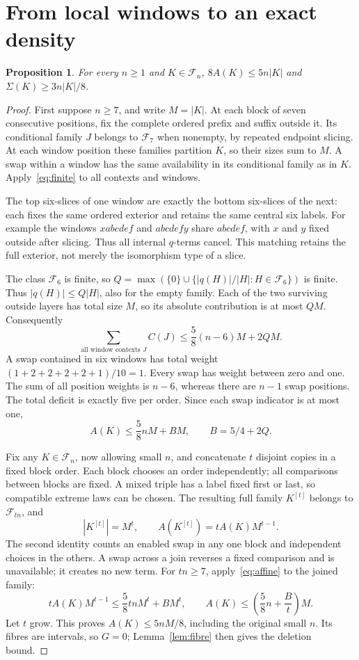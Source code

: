 \documentclass[11pt,letterpaper]{article}
\newtheorem{proposition}[theorem]{Proposition}
\theoremstyle{definition}
\newcommand{\F}{\mathcal F}
\newcommand{\Sig}{\Sigma}
\begin{document}
\clearpage
\section{From local windows to an exact density}\label{sec:windows}
\begin{proposition}\label{prop:density}
For every \(n\geq1\) and \(K\in\F_n\),
\(8A(K)\leq5n|K|\) and \(\Sig(K)\geq3n|K|/8\).
\end{proposition}
\begin{proof}
First suppose \(n\geq7\), and write \(M=|K|\).
At each block of seven consecutive positions, fix the complete ordered
prefix and suffix outside it. Its conditional family \(J\) belongs
to \(\F_7\) when nonempty, by repeated endpoint slicing. At each
window position these families partition \(K\), so their sizes sum
to \(M\). A swap within a window has the same availability in its
conditional family as in \(K\). Apply~\eqref{eq:finite} to all contexts
and windows.

The top six-slices of one window are exactly the bottom six-slices
of the next: each fixes the same ordered exterior and retains the
same central six labels. For example the windows \(xabcdef\) and
\(abcdefy\) share \(abcdef\), with \(x\) and \(y\) fixed outside
after slicing. Thus all internal \(q\)-terms cancel. This matching
retains the full exterior, not merely the isomorphism type of a slice.

The class \(\F_6\) is finite, so
\(Q=\max(\{0\}\cup\{|q(H)|/|H|:H\in\F_6\})\) is finite.
Thus \(|q(H)|\leq Q|H|\), also for the empty family.
Each of the two surviving outside layers has total size
\(M\), so its absolute contribution is at most \(QM\). Consequently
\[
 \sum_{\text{all window contexts }J}C(J)
 \leq\frac58(n-6)M+2QM.
\]
A swap contained in six windows has total weight
\((1+2+2+2+2+1)/10=1\). Every swap has weight between zero and one.
The sum of all position weights is \(n-6\), whereas there are \(n-1\)
swap positions. The total deficit is exactly five per order. Since
each swap indicator is at most one,
\begin{equation}\label{eq:affine}
 A(K)\leq\frac58nM+BM,\qquad B=5/4+2Q.
\end{equation}

Fix any \(K\in\F_n\), now allowing small \(n\), and concatenate
\(t\) disjoint copies in a fixed block order. Each block chooses an
order independently; all comparisons between blocks are fixed.
A mixed triple has a label fixed first or last, so compatible extreme
laws can be chosen. The resulting full family \(K^{[t]}\) belongs
to \(\F_{tn}\), and
\[
 |K^{[t]}|=M^t,\qquad A(K^{[t]})=tA(K)M^{t-1}.
\]
The second identity counts an enabled swap in any one block and
independent choices in the others. A swap across a join reverses a
fixed comparison and is unavailable; it creates no new term.
For \(tn\geq7\), apply~\eqref{eq:affine} to the joined family:
\[
 tA(K)M^{t-1}\leq\frac58tnM^t+BM^t,
 \qquad A(K)\leq\left(\frac58n+\frac Bt\right)M.
\]
Let \(t\) grow. This proves \(A(K)\leq5nM/8\), including the
original small \(n\). Its fibres are intervals, so \(G=0\);
Lemma~\ref{lem:fibre} then gives the deletion bound.
\end{proof}
\end{document}

